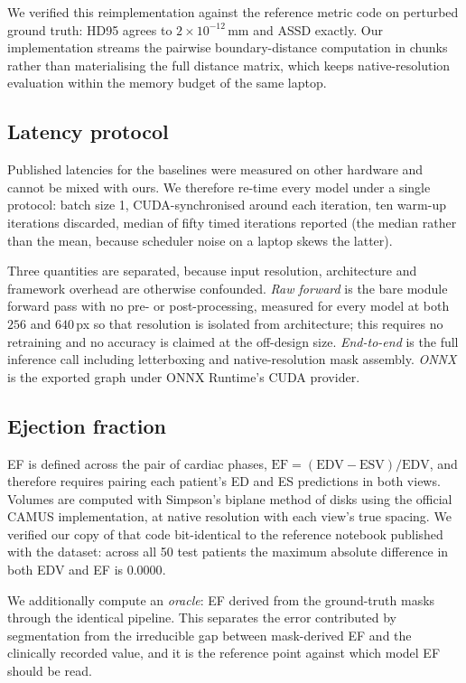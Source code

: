 We verified this reimplementation against the reference metric code on perturbed
ground truth: HD95 agrees to $2\times10^{-12}$\,mm and ASSD exactly. Our
implementation streams the pairwise boundary-distance computation in chunks
rather than materialising the full distance matrix, which keeps
native-resolution evaluation within the memory budget of the same laptop.

\subsection{Latency protocol}
\label{sec:latency-protocol}

Published latencies for the baselines were measured on other hardware and cannot
be mixed with ours. We therefore re-time every model under a single protocol:
batch size 1, CUDA-synchronised around each iteration, ten warm-up iterations
discarded, median of fifty timed iterations reported (the median rather than the
mean, because scheduler noise on a laptop skews the latter).

Three quantities are separated, because input resolution, architecture and
framework overhead are otherwise confounded. \emph{Raw forward} is the bare
module forward pass with no pre- or post-processing, measured for every model at
both $256$ and $640$\,px so that resolution is isolated from architecture; this
requires no retraining and no accuracy is claimed at the off-design size.
\emph{End-to-end} is the full inference call including letterboxing and
native-resolution mask assembly. \emph{ONNX} is the exported graph under ONNX
Runtime's CUDA provider.

\subsection{Ejection fraction}
\label{sec:ef-method}

EF is defined across the pair of cardiac phases,
$\text{EF} = (\text{EDV}-\text{ESV})/\text{EDV}$, and therefore requires pairing
each patient's ED and ES predictions in both views. Volumes are computed with
Simpson's biplane method of disks using the official CAMUS implementation, at
native resolution with each view's true spacing. We verified our copy of that
code bit-identical to the reference notebook published with the dataset: across
all 50 test patients the maximum absolute difference in both EDV and EF is
$0.0000$.

We additionally compute an \emph{oracle}: EF derived from the ground-truth masks
through the identical pipeline. This separates the error contributed by
segmentation from the irreducible gap between mask-derived EF and the clinically
recorded value, and it is the reference point against which model EF should be
read.

